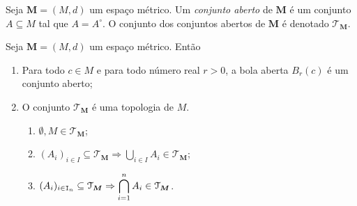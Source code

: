 \begin{defi}
	Seja $\bm M = (M,d)$ um espaço métrico. Um \emph{conjunto aberto} de $\bm M$ é um conjunto $A \subseteq M$ tal que $A = A^\circ$. O conjunto dos conjuntos abertos de $\bm M$ é denotado $\mathcal T_{\bm M}$.
\end{defi}

\begin{prop}
	Seja $\bm M = (M,d)$ um espaço métrico. Então
	\begin{enumerate}
	\item Para todo $c \in M$ e para todo número real $r > 0$, a bola aberta $B_r(c)$ é um conjunto aberto;
	\item O conjunto $\mathcal T_{\bm M}$ é uma topologia de $M$.
		\begin{enumerate}
			\item $\emptyset,M \in \mathcal T_{\bm M}$;
			\item $(A_i)_{i \in I} \subseteq \mathcal T_{\bm M} \Rightarrow \displaystyle\bigcup_{i \in I} A_i \in \mathcal T_{\bm M}$;
			\item $(A_i)_{i \in \mathtt I_n} \subseteq \mathcal T_{\bm M} \Rightarrow \displaystyle\bigcap_{i=1}^n A_i \in \mathcal T_{\bm M}$.
		\end{enumerate}
	\end{enumerate}
\end{prop}
